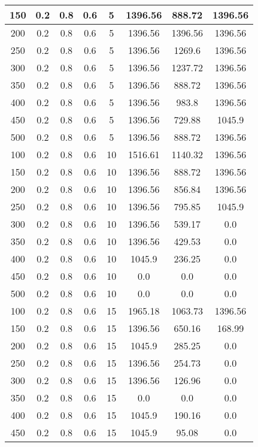\documentclass[a4paper, 12pt]{extreport}
\begin{document}
\begin{itemize}
\begin{longtable}{|c|c|c|c|c|c|c|c|}
			150 & 0.2 & 0.8 & 0.6 & 5 & 1396.56 & 888.72 & 1396.56 \\\hline
			200 & 0.2 & 0.8 & 0.6 & 5 & 1396.56 & 1396.56 & 1396.56 \\\hline
			250 & 0.2 & 0.8 & 0.6 & 5 & 1396.56 & 1269.6 & 1396.56 \\\hline
			300 & 0.2 & 0.8 & 0.6 & 5 & 1396.56 & 1237.72 & 1396.56 \\\hline
			350 & 0.2 & 0.8 & 0.6 & 5 & 1396.56 & 888.72 & 1396.56 \\\hline
			400 & 0.2 & 0.8 & 0.6 & 5 & 1396.56 & 983.8 & 1396.56 \\\hline
			450 & 0.2 & 0.8 & 0.6 & 5 & 1396.56 & 729.88 & 1045.9 \\\hline
			500 & 0.2 & 0.8 & 0.6 & 5 & 1396.56 & 888.72 & 1396.56 \\\hline
			100 & 0.2 & 0.8 & 0.6 & 10 & 1516.61 & 1140.32 & 1396.56 \\\hline
			150 & 0.2 & 0.8 & 0.6 & 10 & 1396.56 & 888.72 & 1396.56 \\\hline
			200 & 0.2 & 0.8 & 0.6 & 10 & 1396.56 & 856.84 & 1396.56 \\\hline
			250 & 0.2 & 0.8 & 0.6 & 10 & 1396.56 & 795.85 & 1045.9 \\\hline
			300 & 0.2 & 0.8 & 0.6 & 10 & 1396.56 & 539.17 & 0.0 \\\hline
			350 & 0.2 & 0.8 & 0.6 & 10 & 1396.56 & 429.53 & 0.0 \\\hline
			400 & 0.2 & 0.8 & 0.6 & 10 & 1045.9 & 236.25 & 0.0 \\\hline
			450 & 0.2 & 0.8 & 0.6 & 10 & 0.0 & 0.0 & 0.0 \\\hline
			500 & 0.2 & 0.8 & 0.6 & 10 & 0.0 & 0.0 & 0.0 \\\hline
			100 & 0.2 & 0.8 & 0.6 & 15 & 1965.18 & 1063.73 & 1396.56 \\\hline
			150 & 0.2 & 0.8 & 0.6 & 15 & 1396.56 & 650.16 & 168.99 \\\hline
			200 & 0.2 & 0.8 & 0.6 & 15 & 1045.9 & 285.25 & 0.0 \\\hline
			250 & 0.2 & 0.8 & 0.6 & 15 & 1396.56 & 254.73 & 0.0 \\\hline
			300 & 0.2 & 0.8 & 0.6 & 15 & 1396.56 & 126.96 & 0.0 \\\hline
			350 & 0.2 & 0.8 & 0.6 & 15 & 0.0 & 0.0 & 0.0 \\\hline
			400 & 0.2 & 0.8 & 0.6 & 15 & 1045.9 & 190.16 & 0.0 \\\hline
			450 & 0.2 & 0.8 & 0.6 & 15 & 1045.9 & 95.08 & 0.0 \\\hline

\end{longtable}
\end{itemize}
\end{document}
